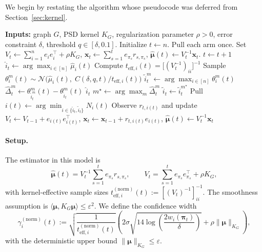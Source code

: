 \documentclass{article}
\begin{document}
We begin by restating the algorithm whose pseudocode was deferred from Section~\ref{sec:kernel}.

\begin{algorithm}[H]
\caption{\texttt{Kernel-TS-Explore}}
\label{algo:kernel-ts-explore}
\begin{algorithmic}[1]
\State \textbf{Inputs:} graph $G$, PSD kernel $K_G$, regularization parameter $\rho>0$, error constraint $\delta$, threshold $q\in[\delta,0.1]$.
\State Initialize $t\gets n$. Pull each arm once.
\State Set $V_t \gets \sum_{i=1}^n e_ie_i^\top + \rho K_G$, \quad $\mathbf{x}_t \gets \sum_{s=1}^t e_{\pi_s}r_{s,\pi_s}$, \quad $\widehat{\bm{\mu}}(t)\gets V_t^{-1}\mathbf{x}_t$.
    \State $t\gets t+1$
    \State $\widehat{i}_t \gets \arg\max_{i\in[n]} \widehat{\mu}_i(t)$
            \State Compute $t_{\mathrm{eff},i}(t)=\bigl[(V_t^{-1})_{ii}\bigr]^{-1}$
            \State Sample $\theta_i^m(t)\sim\mathcal N\!\bigl(\widehat{\mu}_i(t),\;C(\delta,q,t)/t_{\mathrm{eff},i}(t)\bigr)$
        \EndFor
        \State $\widetilde{i}_t^m \gets \arg\max_{i\in[n]} \theta_i^m(t)$
        \State $\widehat{\Delta}_t^m \gets \theta_{\widetilde{i}_t^m}^m(t)-\theta_{\widehat{i}_t}^m(t)$
    \EndFor
        \State \Return $\widehat{i}_t$
    \Else
        \State $m^\star \gets \arg\max_m \widehat{\Delta}_t^m$
        \State $\widetilde{i}_t \gets \widetilde{i}_t^{m^\star}$
        \State Pull $i(t)\gets \arg\min_{i\in\{\widehat{i}_t,\widetilde{i}_t\}} N_i(t)$
        \State Observe $r_{t,i(t)}$ and update $V_t \gets V_{t-1}+e_{i(t)}e_{i(t)}^\top$, \; $\mathbf{x}_t \gets \mathbf{x}_{t-1}+r_{t,i(t)}e_{i(t)}$, \; $\widehat{\bm{\mu}}(t)\gets V_t^{-1}\mathbf{x}_t$
    \EndIf
\EndWhile
\end{algorithmic}
\end{algorithm}

\paragraph{Setup.}
The estimator in this model is
\[
\widehat{\bm\mu}(t)
= V_t^{-1}\sum_{s=1}^t e_{\pi_s}r_{s,\pi_s},
\qquad
V_t = \sum_{s=1}^t e_{\pi_s}e_{\pi_s}^\top + \rho K_G,
\]
with kernel-effective sample sizes $t_{\mathrm{eff},i}^{(\mathrm{norm})}(t):=[(V_t)^{-1}]_{ii}^{-1}$. The smoothness assumption is $\langle\bm\mu,K_G\bm\mu\rangle\le\varepsilon^2$. We define the confidence width
\[
\gamma_i^{(\mathrm{norm})}(t)
:=
\sqrt{\frac{1}{t_{\mathrm{eff},i}^{(\mathrm{norm})}(t)}}
\left(
2\sigma\sqrt{14\log\!\left(\frac{2w_i(\boldsymbol\pi_t)}{\delta}\right)}+\rho\|\bm\mu\|_{K_G}
\right),
\]
with the deterministic upper bound $\|\bm\mu\|_{K_G}\le\varepsilon$.
\end{document}
